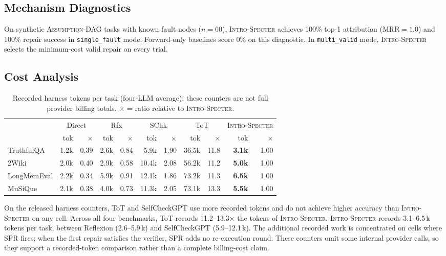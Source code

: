 \documentclass{article}
\newcommand{\method}{\textsc{Intro-Specter}\xspace}
\newcommand{\dagg}{\textsc{Assumption-DAG}\xspace}
\begin{document}
\subsection{Mechanism Diagnostics}

On synthetic \dagg tasks with known fault nodes ($n{=}60$), \method achieves 100\% top-1 attribution (MRR${=}1.0$) and 100\% repair success in \texttt{single\_fault} mode. Forward-only baselines score 0\% on this diagnostic. In \texttt{multi\_valid} mode, \method selects the minimum-cost valid repair on every trial.


\subsection{Cost Analysis}\label{sec:cost}
\begin{table}[t]\centering\small
\caption{Recorded harness tokens per task (four-LLM average); these counters are not full provider billing totals. $\times$ = ratio relative to \method.}
\label{tab:cost-full}\setlength{\tabcolsep}{3pt}
\begin{tabular}{l rr rr rr rr rr}\toprule
& \multicolumn{2}{c}{Direct} & \multicolumn{2}{c}{Rfx} & \multicolumn{2}{c}{SChk} & \multicolumn{2}{c}{ToT} & \multicolumn{2}{c}{\method} \\
\cmidrule(lr){2-3}\cmidrule(lr){4-5}\cmidrule(lr){6-7}\cmidrule(lr){8-9}\cmidrule(lr){10-11}
& tok & $\times$ & tok & $\times$ & tok & $\times$ & tok & $\times$ & tok & $\times$ \\\midrule
TruthfulQA  & 1.2k & 0.39 & 2.6k & 0.84 & 5.9k & 1.90 & 36.5k & 11.8 & \textbf{3.1k} & 1.00 \\
2Wiki       & 2.0k & 0.40 & 2.9k & 0.58 & 10.4k & 2.08 & 56.2k & 11.2 & \textbf{5.0k} & 1.00 \\
LongMemEval & 2.2k & 0.34 & 5.9k & 0.91 & 12.1k & 1.86 & 73.2k & 11.3 & \textbf{6.5k} & 1.00 \\
MuSiQue     & 2.1k & 0.38 & 4.0k & 0.73 & 11.3k & 2.05 & 73.1k & 13.3 & \textbf{5.5k} & 1.00 \\
\bottomrule\end{tabular}\end{table}

On the released harness counters, ToT and SelfCheckGPT use more recorded tokens and do not achieve higher accuracy than \method on any cell. Across all four benchmarks, ToT records 11.2--13.3$\times$ the tokens of \method. \method records 3.1--6.5\,k tokens per task, between Reflexion (2.6--5.9\,k) and SelfCheckGPT (5.9--12.1\,k). The additional recorded work is concentrated on cells where SPR fires; when the first repair satisfies the verifier, SPR adds no re-execution round. These counters omit some internal provider calls, so they support a recorded-token comparison rather than a complete billing-cost claim.
\end{document}
